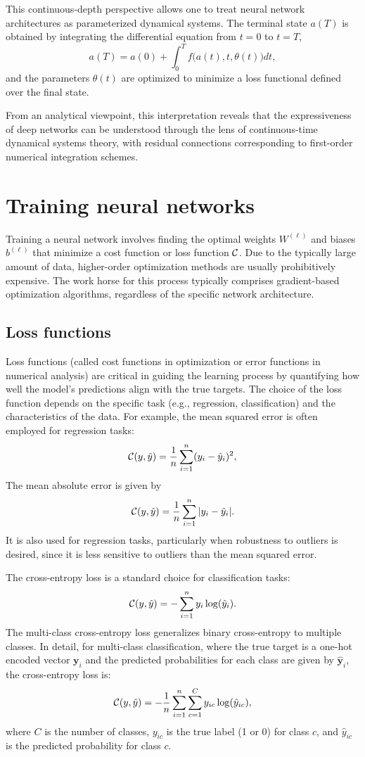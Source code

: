 This continuous-depth perspective allows one to treat neural network architectures as parameterized dynamical systems. The terminal state $a(T)$ is obtained by integrating the differential equation from $t=0$ to $t=T$,
$$
a(T) = a(0) + \int_0^T f\big(a(t), t, \theta(t)\big) dt,
$$
and the parameters $\theta(t)$ are optimized to minimize a loss functional defined over the final state.

From an analytical viewpoint, this interpretation reveals that the expressiveness of deep networks can be understood through the lens of continuous-time dynamical systems theory, with residual connections corresponding to first-order numerical integration schemes. 





\section{Training neural networks}\label{nn:training}

Training a neural network involves finding the optimal weights $W^{(\ell)}$ and biases $b^{(\ell)}$ that minimize a cost function or loss function ${\mathcal C}$. 
Due to the typically large amount of data, higher-order optimization methods are usually prohibitively expensive. The work horse for this process typically comprises gradient-based optimization algorithms, regardless of the specific network architecture. 

\subsection{Loss functions}\label{s:loss}

Loss functions (called cost functions in optimization or error functions in numerical analysis) are critical in guiding the learning process by quantifying how well the model's predictions align with the true targets. The choice of the loss function depends  on the specific task (e.g., regression, classification) and the characteristics of the data. For example, the mean squared error is often employed for regression tasks:
$$
{\mathcal C}(y, \hat{y}) = \frac{1}{n} \sum_{i=1}^n ( y_i - \hat{y}_i )^2,
$$
The  mean absolute error is given by
$$
{\mathcal C}(y, \hat{y}) =  \frac{1}{n} \sum_{i=1}^{n} |y_i - \hat{y}_i|.
$$
It is also used for regression tasks, particularly when robustness to outliers is desired, since it is less sensitive to outliers than the mean squared error.

The cross-entropy loss is a standard choice for classification tasks:
$$
{\mathcal C}(y, \hat{y})  = - \sum_{i=1}^n y_i \log(\hat{y}_i).
$$
The multi-class cross-entropy loss generalizes binary cross-entropy to multiple classes. In detail,
for multi-class classification, where the true target is a one-hot encoded vector $ \mathbf{y}_i $ and the predicted probabilities for each class are given by $ \hat{\mathbf{y}}_i $, the cross-entropy loss is:
$$
{\mathcal C}(y, \hat{y})  = -\frac{1}{n} \sum_{i=1}^{n} \sum_{c=1}^{C} y_{ic} \log(\hat{y}_{ic}),
$$
where $ C $ is the number of classes, $ y_{ic} $ is the true label (1 or 0) for class $ c $, and $ \hat{y}_{ic} $ is the predicted probability for class $ c $.

